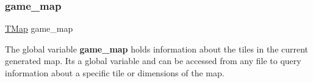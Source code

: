 \subsubsection{\texorpdfstring{game\_map}{game\_map}}
{\footnotesize\ttfamily \mbox{\hyperlink{structTMap}{T\+Map}} game\+\_\+map}

The global variable {\bfseries{game\+\_\+map}} holds information about the tiles in the current generated map. It\textquotesingle{}s a global variable and can be accessed from any file to query information about a specific tile or dimensions of the map. 